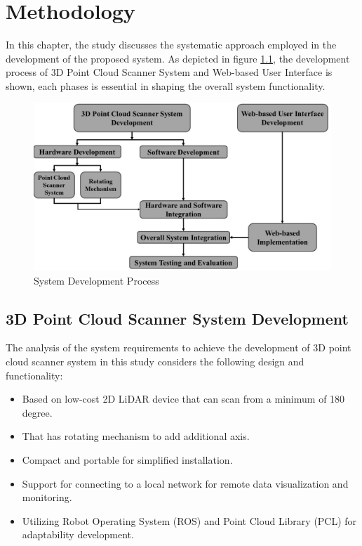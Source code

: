 \renewcommand{\thechapter}{\Roman{chapter}}
\chapter{Methodology}
\renewcommand{\thechapter}{\arabic{chapter}}
\label{ch3:Methodology}
\thispagestyle{empty}

In this chapter, the study discusses the systematic approach employed in the development of the proposed system. As depicted in figure \ref{ch3:fig:system_development_process}, the development process of 3D Point Cloud Scanner System and Web-based User Interface is shown, each phases is essential in shaping the overall system functionality.

\begin{figure}[H]
	\centering
	\includegraphics[width=1\textwidth]{Figures/system_development_process}
	\caption{System Development Process}
	\label{ch3:fig:system_development_process}
\end{figure}

\section{3D Point Cloud Scanner System Development}

The analysis of the system requirements to achieve the development of 3D point cloud scanner system in this study considers the following design and functionality:
\begin{itemize}
	\item Based on low-cost 2D LiDAR device that can scan from  a minimum  of 180 degree.
	\item That has rotating mechanism to add additional axis.
	\item Compact and portable for simplified installation.
	\item Support for connecting to a local network for remote data visualization and monitoring.
	\item Utilizing Robot Operating System (ROS) and Point Cloud Library (PCL) for adaptability development.
\end{itemize}


